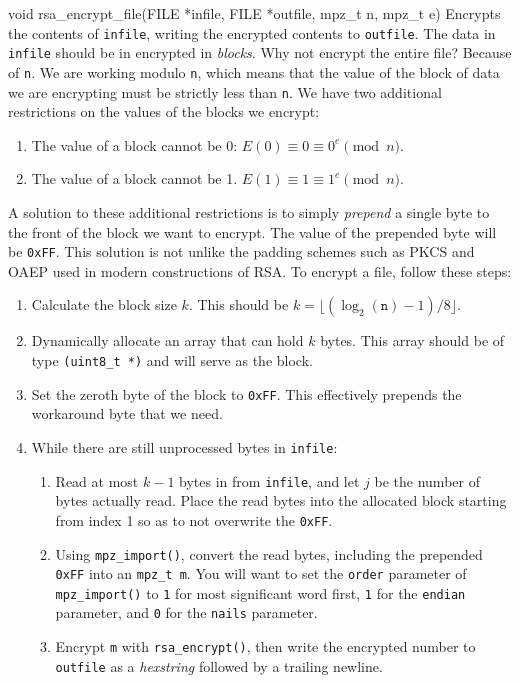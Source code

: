 \begin{funcdoc}{void rsa\_encrypt\_file(FILE *infile, FILE *outfile,
mpz\_t n, mpz\_t e)}
  Encrypts the contents of \texttt{infile}, writing the encrypted
  contents to \texttt{outfile}. The data in \texttt{infile} should be in
  encrypted in \emph{blocks}. Why not encrypt the entire file? Because
  of \texttt{n}. We are working modulo \texttt{n}, which means that the
  value of the block of data we are encrypting must be strictly less
  than \texttt{n}. We have two additional restrictions on the values of
  the blocks we encrypt:
  \begin{enumerate}
    \item The value of a block cannot be 0: $E(0) \equiv 0 \equiv 0^e \pmod{n}$.
    \item The value of a block cannot be 1. $E(1) \equiv 1 \equiv 1^e \pmod{n}$.
  \end{enumerate}
  A solution to these additional restrictions is to simply
  \emph{prepend} a single byte to the front of the block we want to
  encrypt. The value of the prepended byte will be \texttt{0xFF}. This
  solution is not unlike the padding schemes such as PKCS and OAEP used
  in modern constructions of RSA\@. To encrypt a file, follow these
  steps:
  \begin{enumerate}
    \item Calculate the block size $k$. This should be
      $k = \lfloor(\log_2({\texttt{n}}) - 1) / 8\rfloor$.
    \item Dynamically allocate an array that can hold $k$ bytes. This
      array should be of type \texttt{(uint8\_t *)} and will serve as
      the block.
    \item Set the zeroth byte of the block to \texttt{0xFF}. This
      effectively prepends the workaround byte that we need.
    \item While there are still unprocessed bytes in \texttt{infile}:
      \begin{enumerate}
        \item Read at most $k - 1$ bytes in from \texttt{infile}, and
          let $j$ be the number of bytes actually read. Place the read
          bytes into the allocated block starting from index 1 so as to
          not overwrite the \texttt{0xFF}.
        \item Using \texttt{mpz\_import()}, convert the read bytes,
          including the prepended \texttt{0xFF} into an \texttt{mpz\_t
          m}. You will want to set the \texttt{order} parameter of
          \texttt{mpz\_import()} to \texttt{1} for most significant word
          first, \texttt{1} for the \texttt{endian} parameter, and
          \texttt{0} for the \texttt{nails} parameter.
        \item Encrypt \texttt{m} with \texttt{rsa\_encrypt()}, then
          write the encrypted number to \texttt{outfile} as a
          \emph{hexstring} followed by a trailing newline.
      \end{enumerate}
  \end{enumerate}
\end{funcdoc}

